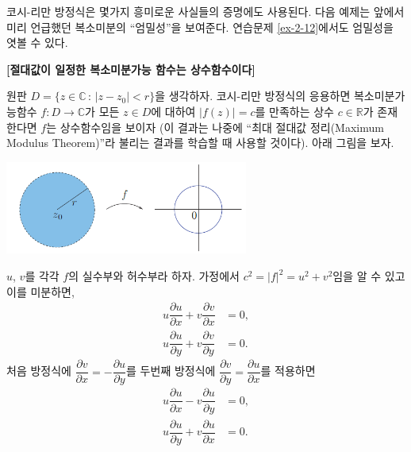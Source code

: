 코시-리만 방정식은 몇가지 흥미로운 사실들의 증명에도 사용된다.
다음 예제는 앞에서 미리 언급했던 복소미분의 ``엄밀성''을 보여준다.
연습문제 \ref{ex-2-12}에서도 엄밀성을 엿볼 수 있다.


\begin{saltexample}{}{}\label{example-2-11}
\textbf{[절대값이 일정한 복소미분가능 함수는 상수함수이다]}  %

원판 $D=\{ z\in\mathbb C \,:\, |z-z_0| <r \}$을 생각하자.
코시-리만 방정식의 응용하면 복소미분가능함수 $f: D \to \mathbb C$가
모든 $z\in D$에 대하여 $|f(z)| =c$를 만족하는 상수 $c\in\mathbb R$가 
존재한다면 $f$는 상수함수임을 보이자 
(이 결과는 나중에 ``최대 절대값 정리(Maximum Modulus Theorem)''라 불리는 결과를
학습할 때 사용할 것이다).
아래 그림을 보자.

\begin{center}
\includegraphics[width=0.6\textwidth]{./SaltChapter/fig-2-0-2}
\end{center}

$u$, $v$를 각각 $f$의 실수부와 허수부라 하자. 
가정에서 $c^2=|f|^2 = u^2 + v^2$임을 알 수 있고 이를 미분하면,
\begin{align*}
u\dfrac{\partial u}{\partial x} + v\dfrac{\partial v}{\partial x} &= 0, \\
u\dfrac{\partial u}{\partial y} + v\dfrac{\partial v}{\partial y} &= 0.
\end{align*}
처음 방정식에 $\dfrac{\partial v}{\partial x} = - \dfrac{\partial u}{\partial y}$를
두번째 방정식에 $\dfrac{\partial v}{\partial y} = \dfrac{\partial u}{\partial x}$를
적용하면
\begin{eqnarray}
u\dfrac{\partial u}{\partial x} - v\dfrac{\partial u}{\partial y} &= 0, \label{eq-2-8}\\
u\dfrac{\partial u}{\partial y} + v\dfrac{\partial u}{\partial x} &= 0. \label{eq-2-9}
\end{eqnarray}


\end{saltexample}
